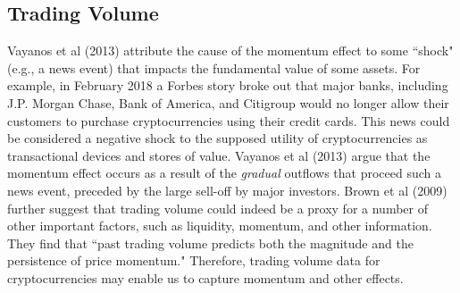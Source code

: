 \documentclass[12pt,twoside]{article}
\begin{document}
\subsection{Trading Volume}
Vayanos et al (2013) attribute the cause of the momentum effect to some ``shock" (e.g., a news event) that impacts the fundamental value of some assets. For example, in February 2018 a Forbes story broke out that major banks, including J.P. Morgan Chase, Bank of America, and Citigroup would no longer allow their customers to purchase cryptocurrencies using their credit cards. This news could be considered a negative shock to the supposed utility of cryptocurrencies as transactional devices and stores of value. Vayanos et al (2013) argue that the momentum effect occurs as a result of the \textit{gradual} outflows that proceed such a news event, preceded by the large sell-off by major investors. Brown et al (2009) further suggest that trading volume could indeed be a proxy for a number of other important factors, such as liquidity, momentum, and other information. They find that ``past trading volume predicts both the magnitude and the persistence of price momentum." Therefore, trading volume data for cryptocurrencies may enable us to capture momentum and other effects.
\end{document}
